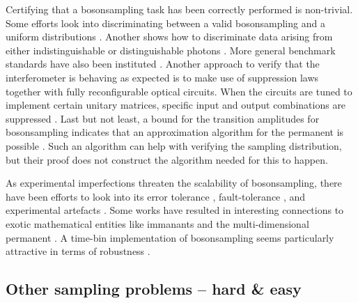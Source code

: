 \documentclass[times,final]{elsarticle}
\newcommand{\peter}[1]{{\color{blue}{#1}}}
\begin{document}
Certifying that a {\sc bosonsampling} task has been correctly performed is non-trivial. Some efforts look into discriminating between a valid {\sc bosonsampling} and a uniform distributions \cite{bib:Gogolin13,bib:Aaronson13}. Another shows how to discriminate data arising from either indistinguishable or distinguishable photons \cite{bib:Spagnolo14,bib:Carolan14}. More general benchmark standards have also been instituted \cite{bib:Walschaeprs16}. Another approach to verify that the interferometer is behaving as expected is to make use of suppression laws \cite{bib:Tichy14} together with fully reconfigurable optical circuits. When the circuits are tuned to implement certain unitary matrices, specific input and output combinations are suppressed \cite{bib:Crespi16}. Last but not least, a bound for the transition amplitudes for {\sc bosonsampling} indicates that an approximation algorithm for the permanent is possible \cite{bib:Yung16}. Such an algorithm can help with verifying the sampling distribution, but their proof does not construct the algorithm needed for this to happen.

As experimental imperfections threaten the scalability of {\sc bosonsampling}, there have been efforts to look into its error tolerance \cite{bib:Rohde12_tol}, fault-tolerance \cite{bib:Leverrier15}, and experimental artefacts \cite{bib:Shchesnobich14,bib:Tamma16}. Some works have resulted in interesting connections to exotic mathematical entities like immanants \cite{bib:Tan2013,bib:deGuise2014} and the multi-dimensional permanent \cite{bib:Tichy15}. A time-bin implementation of {\sc bosonsampling} \cite{bib:Motes14} seems particularly attractive in terms of robustness \cite{bib:Motes15_timebin}.

\subsection{Other sampling problems -- hard \& easy}

\peter{
Numerous other sampling problems have since been described, using, for example,
\begin{enumerate}
	\item Cat states (superpositions of coherent states)
	\item Photon-added coherent states .
	\item Photon-added or -subtracted squeezed vacuum states.
	\item Two-mode squeezed vacuum states (SPDC states).
	\item Gaussian states.
	\item Positive P-function states.
\end{enumerate}
}
\end{document}
